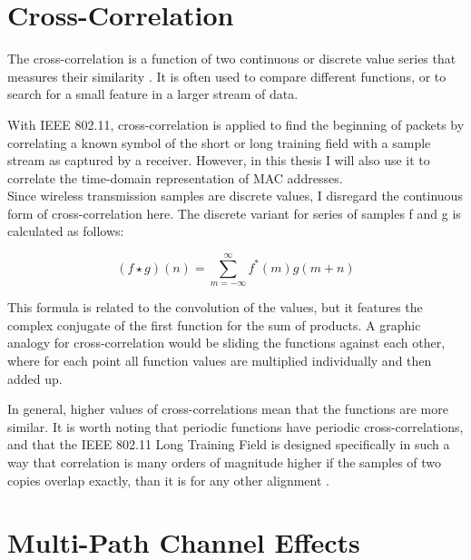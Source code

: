 
\section{Cross-Correlation}

The cross-correlation is a function of two continuous or discrete value series that measures their similarity \cite{rabiner1978}. It is often used to compare different functions, or to search for a small feature in a larger stream of data.

With \gls{IEEE} 802.11, cross-correlation is applied to find the beginning of packets by correlating a known symbol of the short or long training field with a sample stream as captured by a receiver. However, in this thesis I will also use it to correlate the time-domain representation of \gls{MAC} addresses.\\

Since wireless transmission samples are discrete values, I disregard the continuous form of cross-correlation here. The discrete variant for series of samples f and g is calculated as follows:

$$ (f \star g)(n) = \sum_{m=-\infty}^{\infty} f^{\ast}(m) g(m+n) $$\vspace{0cm}

This formula is related to the convolution of the values, but it features the complex conjugate of the first function for the sum of products. A graphic analogy for cross-correlation would be sliding the functions against each other, where for each point all function values are multiplied individually and then added up.

In general, higher values of cross-correlations mean that the functions are more similar. It is worth noting that periodic functions have periodic cross-correlations, and that the \gls{IEEE} 802.11 Long Training Field is designed specifically in such a way that correlation is many orders of magnitude higher if the samples of two copies overlap exactly, than it is for any other alignment \cite{perahia2013}.



\section{Multi-Path Channel Effects}\label{sec:multipath}

